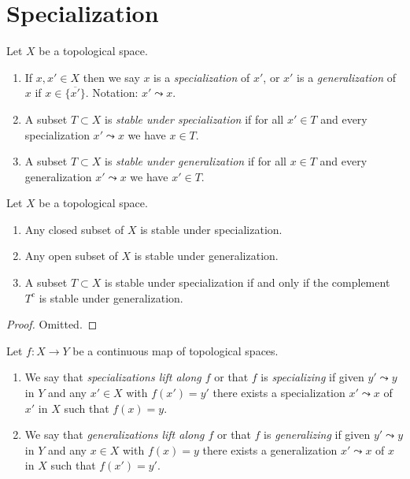 \section{Specialization}
\label{section-specialization}

\begin{definition}
\label{definition-specialization}
Let $X$ be a topological space.
\begin{enumerate}
\item If $x, x' \in X$ then we say $x$ is a {\it specialization} of $x'$,
or $x'$ is a {\it generalization} of $x$ if $x \in \overline{\{x'\}}$.
Notation: $x' \leadsto x$.
\item A subset $T \subset X$ is {\it stable under specialization}
if for all $x' \in T$ and every specialization $x' \leadsto x$ we have
$x \in T$.
\item A subset $T \subset X$ is {\it stable under generalization}
if for all $x \in T$ and every generalization $x' \leadsto x$ we have
$x' \in T$.
\end{enumerate}
\end{definition}

\begin{lemma}
\label{lemma-open-closed-specialization}
Let $X$ be a topological space.
\begin{enumerate}
\item Any closed subset of $X$ is stable under specialization.
\item Any open subset of $X$ is stable under generalization.
\item A subset $T \subset X$ is stable under specialization
if and only if
the complement $T^c$ is stable under generalization.
\end{enumerate}
\end{lemma}

\begin{proof}
Omitted.
\end{proof}

\begin{definition}
\label{definition-lift-specializations}
Let $f : X \to Y$ be a continuous map of topological spaces.
\begin{enumerate}
\item We say that {\it specializations lift along $f$} or that $f$ is
{\it specializing} if given $y' \leadsto y$ in $Y$ and any $x'\in X$ with
$f(x') = y'$ there exists a specialization $x' \leadsto x$ of $x'$ in $X$ such
that $f(x) = y$.
\item We say that {\it generalizations lift along $f$} or that $f$ is
{\it generalizing} if given $y' \leadsto y$ in $Y$ and any $x\in X$ with
$f(x) = y$ there exists a generalization $x' \leadsto x$ of $x$ in $X$ such
that $f(x') = y'$.
\end{enumerate}
\end{definition}

